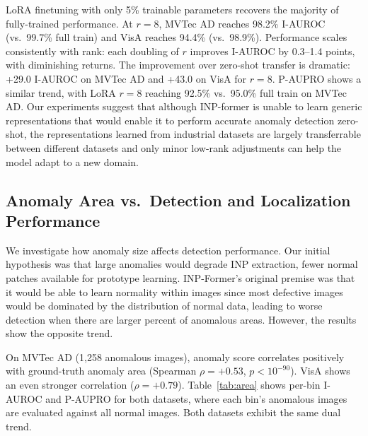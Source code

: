 \documentclass[10pt]{article} %
\begin{document}
LoRA finetuning with only 5\% trainable parameters recovers the majority of fully-trained performance. At $r=8$, MVTec AD reaches 98.2\% I-AUROC (vs.\ 99.7\% full train) and VisA reaches 94.4\% (vs.\ 98.9\%). Performance scales consistently with rank: each doubling of $r$ improves I-AUROC by 0.3--1.4 points, with diminishing returns. The improvement over zero-shot transfer is dramatic: +29.0 I-AUROC on MVTec AD and +43.0 on VisA for $r=8$. P-AUPRO shows a similar trend, with LoRA $r=8$ reaching 92.5\% vs.\ 95.0\% full train on MVTec AD. Our experiments suggest that although INP-former is unable to learn generic representations that would enable it to perform accurate anomaly detection zero-shot, the representations learned from industrial datasets are largely transferrable between different datasets and only minor low-rank adjustments can help the model adapt to a new domain.

\subsection{Anomaly Area vs.\ Detection and Localization Performance}
\label{sec:area}

We investigate how anomaly size affects detection performance. Our initial hypothesis was that large anomalies would degrade INP extraction, fewer normal patches available for prototype learning. INP-Former's original premise was that it would be able to learn normality within images since most defective images would be dominated by the distribution of normal data, leading to worse detection when there are larger percent of anomalous areas. However, the results show the opposite trend.

On MVTec AD (1,258 anomalous images), anomaly score correlates positively with ground-truth anomaly area (Spearman $\rho = +0.53$, $p < 10^{-90}$). VisA shows an even stronger correlation ($\rho = +0.79$). Table~\ref{tab:area} shows per-bin I-AUROC and P-AUPRO for both datasets, where each bin's anomalous images are evaluated against all normal images. Both datasets exhibit the same dual trend.
\end{document}
